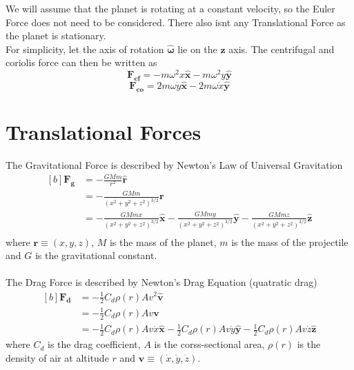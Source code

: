 \documentclass[12pt]{article}
\newcommand{\bs}[1]{\boldsymbol{#1}}
\newcommand{\om}{\omega}
\begin{document}
We will assume that the planet is rotating at a constant velocity, so the Euler Force does not need to be considered. There also isnt any Translational Force as the planet is stationary.\\
For simplicity, let the axis of rotation $\bs{\hat{\om}}$ lie on the $\bs{z}$ axis. The centrifugal and coriolis force can then be written as 
\begin{equation} \bs{F_{cf}} = -m\om^2x\bs{\hat{x}} - m\om^2y\bs{\hat{y}} \end{equation}
\begin{equation} \bs{F_{co}} = 2m\om\dot{y}\bs{\hat{x}} - 2m\om\dot{x}\bs{\hat{y}}\end{equation}

\section{Translational Forces}
The Gravitational Force is described by Newton's Law of Universal Gravitation
\begin{equation}
\begin{aligned}[b]
\bs{F_g} &= -\frac{GMm}{r^2}\bs{\hat{r}}\\
&= -\frac{GMm}{(x^2+y^2+z^2)^{3/2}}\bs{r}\\
&= -\frac{GMmx}{(x^2+y^2+z^2)^{3/2}}\bs{\hat{x}} -\frac{GMmy}{(x^2+y^2+z^2)^{3/2}}\bs{\hat{y}} -\frac{GMmz}{(x^2+y^2+z^2)^{3/2}}\bs{\hat{z}}\\
\end{aligned}
\end{equation}
where $\bs{r} \equiv (x, y, z)$, $M$ is the mass of the planet, $m$ is the mass of the projectile and $G$ is the gravitational constant.\\
\\
The Drag Force is described by Newton's Drag Equation (quatratic drag)
\begin{equation}
\begin{aligned}[b]
\bs{F_d} &= -\frac{1}{2}C_d\rho(r)Av^2\bs{\hat{v}}\\
&= -\frac{1}{2}C_d\rho(r)Av\bs{v}\\
&= -\frac{1}{2}C_d\rho(r)Av\dot{x}\bs{\hat{x}} - \frac{1}{2}C_d\rho(r)Av\dot{y}\bs{\hat{y}} - \frac{1}{2}C_d\rho(r)Av\dot{z}\bs{\hat{z}}
\end{aligned}
\end{equation}
where $C_d$ is the drag coefficient, $A$ is the corss-sectional area, $\rho(r)$ is the density of air at altitude $r$ and $\bs{v} \equiv (\dot{x}, \dot{y}, \dot{z})$.
\end{document}
